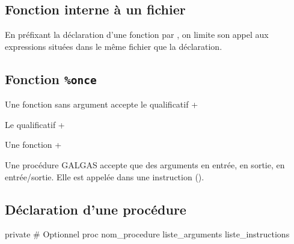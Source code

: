 \subsection{Fonction interne à un fichier}

En préfixant la déclaration d'une fonction par , on limite son appel aux expressions situées dans le même fichier que la déclaration.




\subsection{Fonction \texttt{\%once}}

Une fonction sans argument accepte le qualificatif \ggs+%


Le qualificatif \ggs+%

Une fonction \ggs+%







Une procédure GALGAS accepte que des arguments en entrée, en sortie, en entrée/sortie. Elle est appelée dans une instruction ().

\subsection{Déclaration d'une procédure}

\begin{galgascode}
private # Optionnel
proc nom_procedure liste_arguments {
  liste_instructions
}
\end{galgascode}

